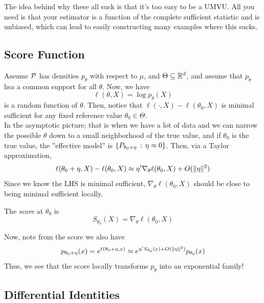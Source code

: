 The idea behind why these all suck is that it's too easy to be a UMVU. All you need is that your estimator is a function of the complete sufficient statistic and is unbiased, which can lead to easily constructing many examples where this sucks.
\clearpage

\subsection*{Score Function}
\sectionspace

Assume $\cal{P}$ has densities $p_{\theta}$ with respect to $\mu$, and $\Theta \subseteq \R^{d}$, and assume that $p_{\theta}$ hsa a common support for all $\theta$. Now, we have
\[ \ell(\theta, X) = \log p_{\theta}(X) \]
is a random function of $\theta$. Then, notice that $\ell(\cdot, X) - \ell(\theta_0, X)$ is minimal sufficient for any fixed reference value $\theta_0 \in \Theta$.\\

In the asymptotic picture; that is when we have a lot of data and we can narrow the possible $\theta$ down to a small neighborhood of the true value, and if $\theta_0$ is the true value, the ''effective model'' is $\{P_{\theta_0 + \eta} \col \eta \approx 0\}$. Then, via a Taylor approximation,
\[ \ell(\theta_0 + \eta, X) - \ell(\theta_0, X) \approx \eta'\nabla_{\theta}\ell(\theta_0, X) + O(\norm{\eta}^2) \]
Since we know the LHS is minimal sufficient, $\nabla_{\theta}\ell(\theta_0, X)$ should be close to being minimal sufficient locally. 

\begin{definition}
    The \emph{score} at $\theta_0$ is 
    \[ S_{\theta_0}(X) = \nabla_{\theta} \ell(\theta_0, X) \]
\end{definition}

Now, note from the score we also have
\[ p_{\theta_0 + \eta}(x) = e^{\ell(\theta_0 + \eta, x)} \approx e^{\eta'S_{\theta_0}(x) + O(\norm{\eta}^2)}p_{\theta_0}(x) \]
Thus, we see that the score locally transforms $p_{\theta}$ into an exponential family!

\subsection*{Differential Identities}

